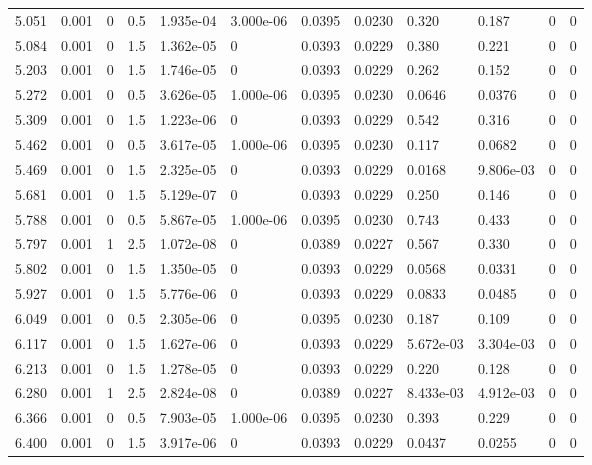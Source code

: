 \documentclass[preview]{standalone}
\begin{document}
{{{\begin{tabular}{L{1.2cm}C{1.2cm} C{0.3cm}C{0.5cm} C{1.4cm}C{1.4cm} C{1.4cm}C{1.4cm} C{1.6cm}C{1.6cm} C{1.6cm}C{1.6cm}}
  5.051  &  0.001  & 0     & 0.5 &  1.935e-04  & 3.000e-06  &  0.0395&   0.0230& 0.320 & 0.187   &  0 & 0  \\ 
  5.084  &  0.001  & 0     & 1.5 &  1.362e-05  & 0  &  0.0393&   0.0229& 0.380 & 0.221   &  0 & 0  \\ 
  5.203  &  0.001  & 0     & 1.5 &  1.746e-05  & 0  &  0.0393&   0.0229& 0.262 & 0.152   &  0 & 0  \\ 
  5.272  &  0.001  & 0     & 0.5 &  3.626e-05  & 1.000e-06  &  0.0395&   0.0230& 0.0646 & 0.0376   &  0 & 0  \\ 
  5.309  &  0.001  & 0     & 1.5 &  1.223e-06  & 0  &  0.0393&   0.0229& 0.542 & 0.316   &  0 & 0  \\ 
  5.462  &  0.001  & 0     & 0.5 &  3.617e-05  & 1.000e-06  &  0.0395&   0.0230& 0.117 & 0.0682   &  0 & 0  \\ 
  5.469  &  0.001  & 0     & 1.5 &  2.325e-05  & 0  &  0.0393&   0.0229& 0.0168 & 9.806e-03   &  0 & 0  \\ 
  5.681  &  0.001  & 0     & 1.5 &  5.129e-07  & 0  &  0.0393&   0.0229& 0.250 & 0.146   &  0 & 0  \\ 
  5.788  &  0.001  & 0     & 0.5 &  5.867e-05  & 1.000e-06  &  0.0395&   0.0230& 0.743 & 0.433   &  0 & 0  \\ 
  5.797  &  0.001  & 1     & 2.5 &  1.072e-08  & 0  &  0.0389&   0.0227& 0.567 & 0.330   &  0 & 0  \\ 
  5.802  &  0.001  & 0     & 1.5 &  1.350e-05  & 0  &  0.0393&   0.0229& 0.0568 & 0.0331   &  0 & 0  \\ 
  5.927  &  0.001  & 0     & 1.5 &  5.776e-06  & 0  &  0.0393&   0.0229& 0.0833 & 0.0485   &  0 & 0  \\ 
  6.049  &  0.001  & 0     & 0.5 &  2.305e-06  & 0  &  0.0395&   0.0230& 0.187 & 0.109   &  0 & 0  \\ 
  6.117  &  0.001  & 0     & 1.5 &  1.627e-06  & 0  &  0.0393&   0.0229& 5.672e-03 & 3.304e-03   &  0 & 0  \\ 
  6.213  &  0.001  & 0     & 1.5 &  1.278e-05  & 0  &  0.0393&   0.0229& 0.220 & 0.128   &  0 & 0  \\ 
  6.280  &  0.001  & 1     & 2.5 &  2.824e-08  & 0  &  0.0389&   0.0227& 8.433e-03 & 4.912e-03   &  0 & 0  \\ 
  6.366  &  0.001  & 0     & 0.5 &  7.903e-05  & 1.000e-06  &  0.0395&   0.0230& 0.393 & 0.229   &  0 & 0  \\ 
  6.400  &  0.001  & 0     & 1.5 &  3.917e-06  & 0  &  0.0393&   0.0229& 0.0437 & 0.0255   &  0 & 0  \\ 

\end{tabular}}}}
\end{document}

